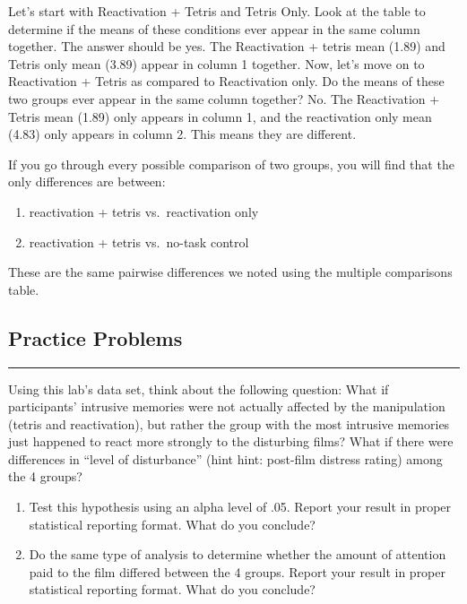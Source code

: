 \documentclass[]{book}
\providecommand{\tightlist}{%
  \setlength{\itemsep}{0pt}\setlength{\parskip}{0pt}}
\begin{document}
Let's start with Reactivation + Tetris and Tetris Only. Look at the
table to determine if the means of these conditions ever appear in the
same column together. The answer should be yes. The Reactivation +
tetris mean (1.89) and Tetris only mean (3.89) appear in column 1
together. Now, let's move on to Reactivation + Tetris as compared to
Reactivation only. Do the means of these two groups ever appear in the
same column together? No. The Reactivation + Tetris mean (1.89) only
appears in column 1, and the reactivation only mean (4.83) only appears
in column 2. This means they are different.

If you go through every possible comparison of two groups, you will find
that the only differences are between:

\begin{enumerate}
\def\labelenumi{\arabic{enumi}.}
\tightlist
\item
  reactivation + tetris vs.~reactivation only
\item
  reactivation + tetris vs.~no-task control
\end{enumerate}

These are the same pairwise differences we noted using the multiple
comparisons table.

\subsection{Practice Problems}\label{practice-problems-7}

\begin{center}\rule{0.5\linewidth}{0.5pt}\end{center}

Using this lab's data set, think about the following question: What if
participants' intrusive memories were not actually affected by the
manipulation (tetris and reactivation), but rather the group with the
most intrusive memories just happened to react more strongly to the
disturbing films? What if there were differences in ``level of
disturbance'' (hint hint: post-film distress rating) among the 4 groups?

\begin{enumerate}
\def\labelenumi{\arabic{enumi}.}
\item
  Test this hypothesis using an alpha level of .05. Report your result
  in proper statistical reporting format. What do you conclude?
\item
  Do the same type of analysis to determine whether the amount of
  attention paid to the film differed between the 4 groups. Report your
  result in proper statistical reporting format. What do you conclude?
\end{enumerate}
\end{document}

